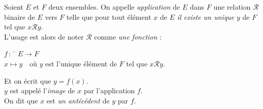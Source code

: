 \documentclass[a4paper,12pt,french]{book}
\begin{document}
\begin{definition}
Soient $E$ et $F$ deux ensembles. On appelle \textit{application} de $E$ dans $F$ une relation $\mathcal{R}$ binaire de $E$ vers $F$ telle que pour tout élément $x$ de $E$ \textit{il existe un unique} $y$ de $F$ tel que $x\mathcal{R}y$.\\

L'usage est alors de noter $\mathcal{R}$ comme \textit{une fonction} :

\begin{tabbing}
$f\,:\,$ \=	$E\longrightarrow F$\\
\>	$x \longmapsto y$\ \ où $y$ est l'unique élément de $F$ tel que $x\mathcal{R}y$.
\end{tabbing}

Et on écrit que $y=f(x)$.\\

$y$ est appelé l'\textit{image} de $x$ par l'application $f$.\\
On dit que $x$ est \textit{un antécédent} de $y$ par $f$.
\end{definition}
\end{document}
